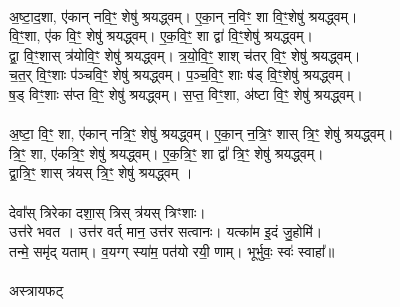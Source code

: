 \\
अ॒ष्टा॒द॒शा, ए॑कान् नवि॒ꣳ॒ शेषु॑ श्रयद्ध्वम्। ए॒का॒न् न॒विꣳ॒ शा वि॒ꣳ॒शेषु॑ श्रयद्ध्वम्। \\
वि॒ꣳ॒शा, ए॑क वि॒ꣳ॒ शेषु॑ श्रयद्ध्वम्। ए॒क॒वि॒ꣳ॒ शा द्वा॑ वि॒ꣳ॒शेषु॑ श्रयद्ध्वम्। \\
द्वा॒ वि॒ꣳ॒शास् त्र॑योवि॒ꣳ॒ शेषु॑ श्रयद्ध्वम्। त्र॒यो॒वि॒ꣳ॒ शाश् च॑तर् वि॒ꣳ॒ शेषु॑ श्रयद्ध्वम्। \\
च॒त॒र् वि॒ꣳ॒शाः प॑ञ्चवि॒ꣳ॒ शेषु॑ श्रयद्ध्वम्। प॒ञ्च॒वि॒ꣳ॒ शाः ष॑ड् वि॒ꣳ॒शेषु॑ श्रयद्ध्वम्। \\
ष॒ड् विꣳ॒शाः स॑प्त वि॒ꣳ॒ शेषु॑ श्रयद्ध्वम्। स॒प्त॒ विꣳ॒शा, अ॑ष्टा वि॒ꣳ॒ शेषु॑ श्रयद्ध्वम्। \\
\\
अ॒ष्टा॒ वि॒ꣳ॒ शा, ए॑कान् नत्रि॒ꣳ॒ शेषु॑ श्रयद्ध्वम्। ए॒का॒न् न॒त्रि॒ꣳ शास् त्रि॒ꣳ॒ शेषु॑ श्रयद्ध्वम्। \\
त्रि॒ꣳ॒ शा, ए॑कत्रि॒ꣳ॒ शेषु॑ श्रयद्ध्वम्। ए॒क॒त्रि॒ꣳ॒ शा द्वा᳚ त्रि॒ꣳ॒ शेषु॑ श्रयद्ध्वम्।\\
द्वा॒त्रि॒ꣳ॒ शास् त्र॑यस् त्रि॒ꣳ॒ शेषु॑ श्रयद्ध्वम् । \\
\\
देवा᳚स् त्रिरेका दशा॒स् त्रिस् त्र॑यस् त्रिꣳशाः। \\
उत्त॑रे भवत । उत्त॑र वर्त् मान॒ उत्त॑र सत्वानः। यत्का॑म इ॒दं जु॒होमि॑।\\
तन्मे॒ समृ॑द् यताम्। व॒यग्ग् स्या॑म॒ पत॑यो रयी॒ णाम्। भूर्भुवः॒ स्वः॑ स्वाहा᳚॥\\
\\
अस्त्रायफट्\\

